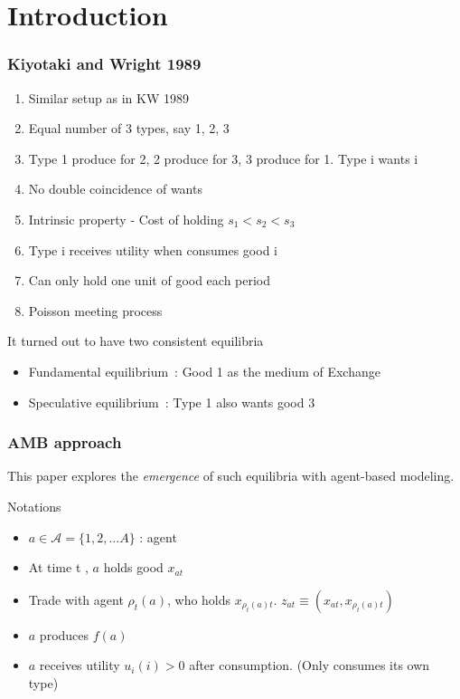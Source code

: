 \section{Introduction}

\begin{frame}
    \frametitle{Kiyotaki and Wright 1989}

    \begin{enumerate}[<+->]
        \item Similar setup as in KW 1989
        \item Equal number of 3 types, say 1, 2, 3
        \item Type 1 produce for 2, 2 produce for 3, 3 produce for 1. Type i wants i
        \item No double coincidence of wants
        \item Intrinsic property - Cost of holding $s_1 < s_2 < s_3$
        \item Type i receives utility when consumes good i
        \item Can only hold one unit of good each period
        \item Poisson meeting process
    \end{enumerate}

    \vfill
    \pause
    It turned out to have two consistent equilibria
    \begin{itemize}
        \item Fundamental equilibrium~: Good 1 as the medium of Exchange
        \item Speculative equilibrium~: Type 1 also wants good 3
    \end{itemize}
\end{frame}

\begin{frame}
    \frametitle{AMB approach}
    This paper explores the \emph{emergence} of such equilibria with agent-based modeling.

    Notations
    \begin{itemize}
        \item $a\in \mathscr{A}=\{1,2,...A\}$ : agent
        \item At time t , $a$ holds good $x_{at}$
        \item Trade with agent $\rho_t(a)$, 
        who holds $x_{\rho_t(a)t}$. $z_{at}\equiv(x_{at}, x_{\rho_t(a)t})$
        \item $a$ produces $f(a)$
        \item $a$ receives utility $u_i(i) > 0$ after consumption. (Only consumes its own type)
    \end{itemize}

\end{frame}

